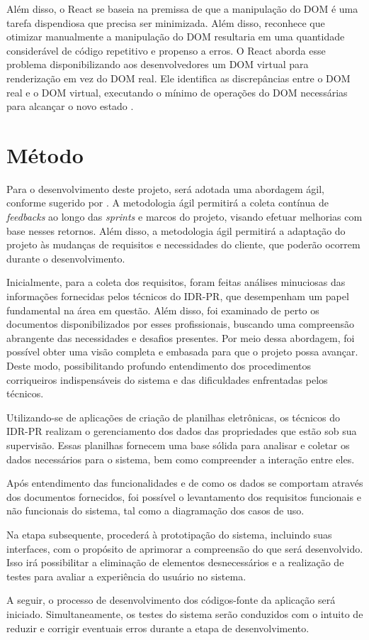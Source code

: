 Além disso, o React se baseia na premissa de que a manipulação do \gls{DOM} é uma tarefa dispendiosa que precisa ser minimizada. Além disso, reconhece que otimizar manualmente a manipulação do \gls{DOM} resultaria em uma quantidade considerável de código repetitivo e propenso a erros. O React aborda esse problema disponibilizando aos desenvolvedores um \gls{DOM} virtual para renderização em vez do \gls{DOM} real. Ele identifica as discrepâncias entre o \gls{DOM} real e o \gls{DOM} virtual, executando o mínimo de operações do \gls{DOM} necessárias para alcançar o novo estado \cite{Vipul:2016:ReactJSByExampleBuildingModernWebApplications}.

\section{Método}\label{sec:metodo}

Para o desenvolvimento deste projeto, será adotada uma abordagem ágil, conforme sugerido por . A metodologia ágil permitirá a coleta contínua de \textit{feedbacks} ao longo das \textit{sprints} e marcos do projeto, visando efetuar melhorias com base nesses retornos.
Além disso, a metodologia ágil permitirá a adaptação do projeto às mudanças de requisitos e necessidades do cliente, que poderão ocorrem durante o desenvolvimento.

Inicialmente, para a coleta dos requisitos, foram feitas análises minuciosas das informações fornecidas pelos técnicos do \gls{IDR-PR}, que desempenham um papel fundamental na área em questão. Além disso, foi examinado de perto os documentos disponibilizados por esses profissionais, buscando uma compreensão abrangente das necessidades e desafios presentes. Por meio dessa abordagem, foi possível obter uma visão completa e embasada para que o projeto possa avançar. Deste modo, possibilitando profundo entendimento dos procedimentos corriqueiros indispensáveis do sistema e das dificuldades enfrentadas pelos técnicos.

Utilizando-se de aplicações de criação de planilhas eletrônicas, os técnicos do \gls{IDR-PR} realizam o gerenciamento dos dados das propriedades que estão sob sua supervisão. Essas planilhas fornecem uma base sólida para analisar e coletar os dados necessários para o sistema, bem como compreender a interação entre eles.

Após entendimento das funcionalidades e de como os dados se comportam através dos documentos fornecidos, foi possível o levantamento dos requisitos funcionais e não funcionais do sistema, tal como a diagramação dos casos de uso.

Na etapa subsequente, procederá à prototipação do sistema, incluindo suas interfaces, com o propósito de aprimorar a compreensão do que será desenvolvido. Isso irá possibilitar a eliminação de elementos desnecessários e a realização de testes para avaliar a experiência do usuário no sistema.

A seguir, o processo de desenvolvimento dos códigos-fonte da aplicação será iniciado. Simultaneamente, os testes do sistema serão conduzidos com o intuito de reduzir e corrigir eventuais erros durante a etapa de desenvolvimento.

